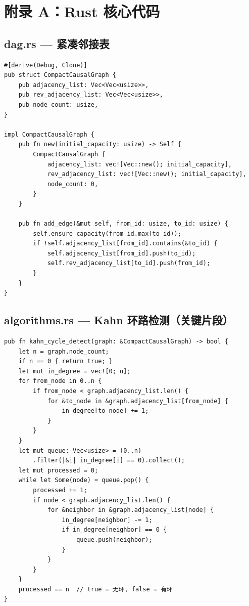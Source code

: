 \documentclass[12pt, a4paper]{ctexart}
\begin{document}
\newpage
\appendix
\section{附录 A：Rust 核心代码}

\subsection{dag.rs — 紧凑邻接表}

\begin{lstlisting}[style=rust, caption={CompactCausalGraph 结构体定义}]
#[derive(Debug, Clone)]
pub struct CompactCausalGraph {
    pub adjacency_list: Vec<Vec<usize>>,
    pub rev_adjacency_list: Vec<Vec<usize>>,
    pub node_count: usize,
}

impl CompactCausalGraph {
    pub fn new(initial_capacity: usize) -> Self {
        CompactCausalGraph {
            adjacency_list: vec![Vec::new(); initial_capacity],
            rev_adjacency_list: vec![Vec::new(); initial_capacity],
            node_count: 0,
        }
    }

    pub fn add_edge(&mut self, from_id: usize, to_id: usize) {
        self.ensure_capacity(from_id.max(to_id));
        if !self.adjacency_list[from_id].contains(&to_id) {
            self.adjacency_list[from_id].push(to_id);
            self.rev_adjacency_list[to_id].push(from_id);
        }
    }
}
\end{lstlisting}

\subsection{algorithms.rs — Kahn 环路检测（关键片段）}

\begin{lstlisting}[style=rust, caption={Kahn 拓扑排序环路检测}]
pub fn kahn_cycle_detect(graph: &CompactCausalGraph) -> bool {
    let n = graph.node_count;
    if n == 0 { return true; }
    let mut in_degree = vec![0; n];
    for from_node in 0..n {
        if from_node < graph.adjacency_list.len() {
            for &to_node in &graph.adjacency_list[from_node] {
                in_degree[to_node] += 1;
            }
        }
    }
    let mut queue: Vec<usize> = (0..n)
        .filter(|&i| in_degree[i] == 0).collect();
    let mut processed = 0;
    while let Some(node) = queue.pop() {
        processed += 1;
        if node < graph.adjacency_list.len() {
            for &neighbor in &graph.adjacency_list[node] {
                in_degree[neighbor] -= 1;
                if in_degree[neighbor] == 0 {
                    queue.push(neighbor);
                }
            }
        }
    }
    processed == n  // true = 无环, false = 有环
}
\end{lstlisting}
\end{document}
